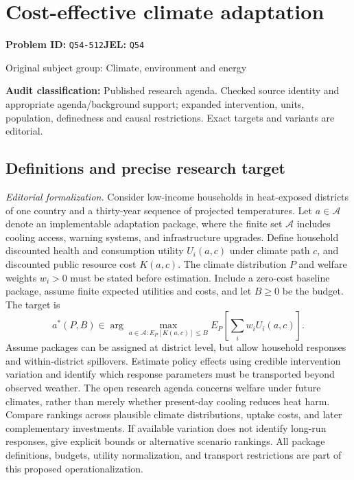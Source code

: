 \documentclass[11pt,a4paper]{article}
\begin{document}
\section*{Cost-effective climate adaptation}
\textbf{Problem ID:} \texttt{Q54-512}\quad \textbf{JEL:} \texttt{Q54}\par
\label{problem:OP-0433}
{\sffamily\small\color{muted}Original subject group: Climate, environment and energy\par}
\label{definitions:problem:30007715}
\textbf{Audit classification:} Published research agenda. Checked source identity and appropriate agenda/background support; expanded intervention, units, population, definedness and causal restrictions. Exact targets and variants are editorial.
\subsection*{Definitions and precise research target}
\textit{Editorial formalization.} Consider low-income households in heat-exposed districts of one country and a thirty-year sequence of projected temperatures. Let \(a\in\mathcal A\) denote an implementable adaptation package, where the finite set \(\mathcal A\) includes cooling access, warning systems, and infrastructure upgrades. Define household discounted health and consumption utility \(U_i(a,c)\) under climate path \(c\), and discounted public resource cost \(K(a,c)\). The climate distribution \(P\) and welfare weights \(w_i>0\) must be stated before estimation. Include a zero-cost baseline package, assume finite expected utilities and costs, and let \(B\geq0\) be the budget. The target is
\[a^*(P,B)\in\arg\max_{a\in\mathcal A:E_P[K(a,c)]\leq B}E_P\!\left[\sum_i w_iU_i(a,c)\right].\]
Assume packages can be assigned at district level, but allow household responses and within-district spillovers. Estimate policy effects using credible intervention variation and identify which response parameters must be transported beyond observed weather. The open research agenda concerns welfare under future climates, rather than merely whether present-day cooling reduces heat harm. Compare rankings across plausible climate distributions, uptake costs, and later complementary investments. If available variation does not identify long-run responses, give explicit bounds or alternative scenario rankings. All package definitions, budgets, utility normalization, and transport restrictions are part of this proposed operationalization.
\end{document}
